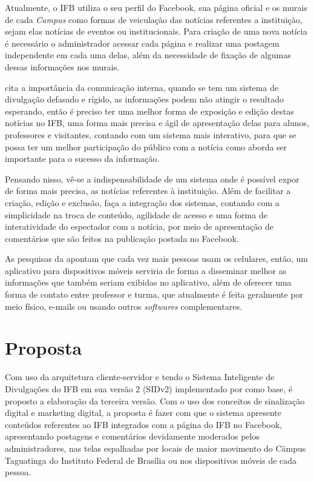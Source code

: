 Atualmente, o IFB utiliza o seu perfil do Facebook, sua página oficial e os murais de cada \textit{Campus} como formas de veiculação das notícias referentes a instituição, sejam elas notícias de eventos ou institucionais. Para criação de uma nova notícia é necessário o administrador acessar cada página e realizar uma postagem independente em cada uma delas, além da necessidade de fixação de algumas dessas informações nos murais. 

\citet{pinheiro2010} cita a importância da comunicação interna, quando se tem um sistema de divulgação defasado e rígido, as informações podem não atingir o resultado esperando, então é preciso ter uma melhor forma de exposição e edição destas notícias no IFB, uma forma mais precisa e ágil de apresentação delas para alunos, professores e visitantes, contando com um sistema mais interativo, para que se possa ter um melhor participação do público com a notícia como \citet{santos2014} aborda ser importante para o sucesso da informação.

Pensando nisso, vê-se a indispensabilidade de um sistema onde é possível expor de forma mais precisa, as notícias referentes à instituição. Além de facilitar a criação, edição e exclusão, faça a integração dos sistemas, contando com a simplicidade na troca de conteúdo, agilidade de acesso e uma forma de interatividade do espectador com a notícia, por meio de apresentação de comentários que são feitos na publicação postada no Facebook.

As pesquisas da \cite{emarketer} apontam que cada vez mais pessoas usam os celulares, então, um aplicativo para dispositivos móveis serviria de forma a disseminar melhor as informações que também seriam exibidas no aplicativo, além de oferecer uma forma de contato entre professor e turma, que atualmente é feita geralmente por meio físico, e-mails ou usando outros \textit{softwares} complementares.

\section{Proposta}
Com uso da arquitetura cliente-servidor e tendo o  Sistema Inteligente de Divulgações do IFB em sua versão 2 (SIDv2) implementado por \cite{sobrinho2017} como base, é proposto a elaboração da terceira versão. Com o uso dos conceitos de sinalização digital e marketing digital, a proposta é fazer com que o sistema apresente conteúdos referentes ao IFB integrados com a página do IFB no Facebook, apresentando postagens e comentários devidamente moderados pelos administradores, nas telas espalhadas por locais de maior movimento do Câmpus Taguatinga do Instituto Federal de Brasília ou nos dispositivos móveis de cada pessoa. 

